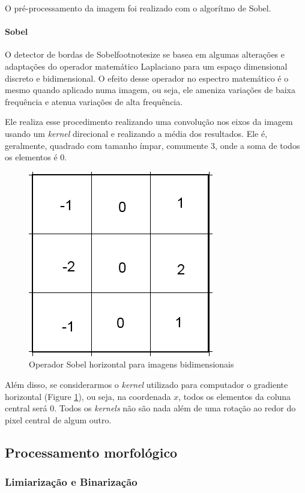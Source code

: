 \documentclass[10pt,twocolumn,letterpaper]{article}
\begin{document}
	O pré-processamento da imagem foi realizado com o algorítmo de Sobel.
\paragraph{Sobel}
	O detector de bordas de Sobel{footnotesize \cite{sobel1}} se basea em algumas
alterações e adaptações do operador matemático Laplaciano{\footnotesize \cite{laplace1}}
para um espaço dimensional discreto e bidimensional{\footnotesize \cite{laplace2}}. O
efeito desse operador no espectro matemático é o mesmo quando aplicado numa imagem,
ou seja, ele ameniza variações de baixa frequência e atenua variações de alta frequência.{\footnotesize \cite{sobel2}}

	Ele realiza esse procedimento realizando uma convolução nos eixos da imagem
usando um \emph{kernel} direcional e realizando a média dos resultados. Ele é,
geralmente, quadrado com tamanho ímpar, comumente 3, onde a soma de todos
os elementos é 0.


\begin{figure}[!htp]
\centering
\includegraphics[width=0.5\columnwidth]{SobelGx}
\caption{Operador Sobel horizontal para imagens bidimensionais}
\label{fig:SobelGx}
\end{figure}

Além disso, se considerarmos o \emph{kernel} utilizado para computador o gradiente
horizontal (Figure \ref{fig:SobelGx}), ou seja, na coordenada $x$, todos os elementos
da coluna central será 0. Todos os \emph{kernels} não são nada além de uma rotação
ao redor do pixel central de algum outro.

\subsection{Processamento morfológico}

\subsubsection{Limiarização e Binarização}
\end{document}
